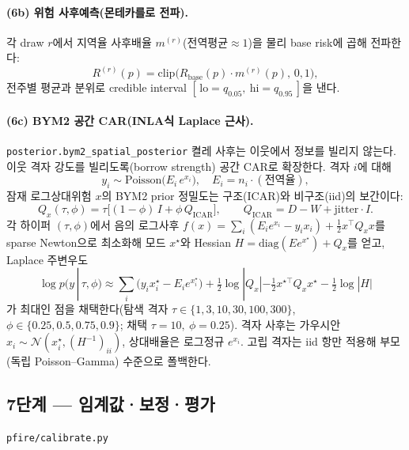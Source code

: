 \documentclass[11pt,a4paper]{article}
\newcommand{\src}[1]{{\footnotesize\color{gray}\texttt{#1}}}
\newcommand{\clip}{\mathrm{clip}}
\begin{document}
\paragraph{(6b) 위험 사후예측(몬테카를로 전파).}
각 draw $r$에서 지역율 사후배율 $m^{(r)}$(전역평균$\approx 1$)을 물리 base risk에 곱해 전파한다:
\begin{equation}
R^{(r)}(p)=\clip\!\big(R_{\text{base}}(p)\cdot m^{(r)}(p),\,0,1\big),
\end{equation}
전주별 평균과 분위로 credible interval $[\,\mathrm{lo}=q_{0.05},\ \mathrm{hi}=q_{0.95}\,]$을 낸다.

\paragraph{(6c) BYM2 공간 CAR(INLA식 Laplace 근사).} \src{posterior.bym2\_spatial\_posterior}
켤레 사후는 이웃에서 정보를 빌리지 않는다. 이웃 격자 강도를 빌리도록(borrow strength) 공간 CAR로
확장한다. 격자 $i$에 대해
\begin{equation}
y_i\sim\mathrm{Poisson}\!\big(E_i\,e^{x_i}\big),\quad E_i=n_i\cdot(\text{전역율}),
\end{equation}
잠재 로그상대위험 $x$의 BYM2 prior 정밀도는 구조(ICAR)와 비구조(iid)의 보간이다:
\begin{equation}
Q_x(\tau,\phi)=\tau\big[(1-\phi)\,I+\phi\,Q_{\text{ICAR}}\big],\qquad
Q_{\text{ICAR}}=D-W+\text{jitter}\cdot I.
\label{eq:bym2Q}
\end{equation}
각 하이퍼 $(\tau,\phi)$에서 음의 로그사후
$f(x)=\sum_i(E_i e^{x_i}-y_i x_i)+\tfrac12 x^\top Q_x x$를 sparse Newton으로 최소화해 모드 $x^\star$와
Hessian $H=\mathrm{diag}(E e^{x^\star})+Q_x$를 얻고, Laplace 주변우도
\begin{equation}
\log p(y\,|\,\tau,\phi)\approx
\sum_i\!\big(y_i x_i^\star-E_i e^{x_i^\star}\big)
+\tfrac12\log|Q_x|-\tfrac12 x^{\star\top}Q_x x^\star-\tfrac12\log|H|
\label{eq:laplace}
\end{equation}
가 최대인 점을 채택한다(탐색 격자 $\tau\in\{1,3,10,30,100,300\}$, $\phi\in\{0.25,0.5,0.75,0.9\}$;
채택 $\tau{=}10,\ \phi{=}0.25$). 격자 사후는 가우시안 $x_i\sim\mathcal N(x_i^\star,(H^{-1})_{ii})$,
상대배율은 로그정규 $e^{x_i}$. 고립 격자는 iid 항만 적용해 부모(독립 Poisson--Gamma) 수준으로 폴백한다.

\subsection{7단계 — 임계값·보정·평가}\label{sec:eval}
\src{pfire/calibrate.py}
\end{document}
